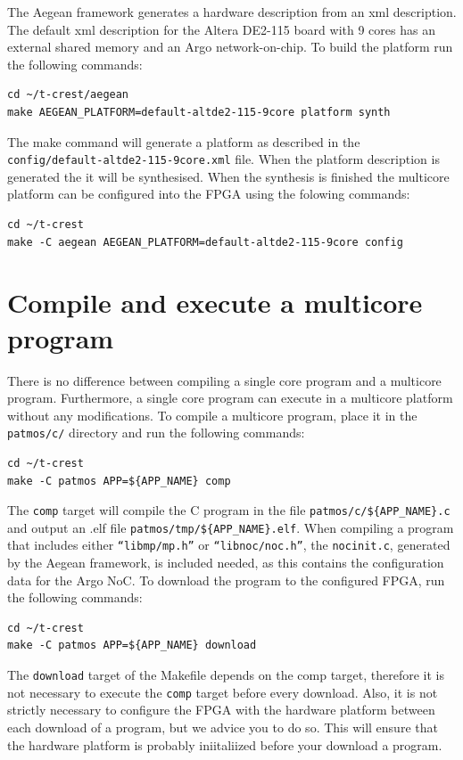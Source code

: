 \documentclass[a4paper,fontsize=10pt,twoside,DIV15,BCOR12mm,headinclude=true,footinclude=false,pagesize,bibtotoc]{scrbook}
\newcommand{\code}[1]{{\texttt{#1}}}
\begin{document}
The Aegean framework generates a hardware description from an
xml description.
The default xml description for the Altera DE2-115 board with 9 cores
has an external shared memory and an Argo network-on-chip.
To build the platform run the following commands:
\begin{Verbatim}
cd ~/t-crest/aegean
make AEGEAN_PLATFORM=default-altde2-115-9core platform synth
\end{Verbatim}
The make command will generate a platform as described in the
\code{config/default-altde2-115-9core.xml} file.
When the platform description is generated the it will be synthesised.
When the synthesis is finished the multicore platform can be
configured into the FPGA using the folowing commands:
\begin{Verbatim}
cd ~/t-crest
make -C aegean AEGEAN_PLATFORM=default-altde2-115-9core config
\end{Verbatim}

\section{Compile and execute a multicore program}
\label{apx:buildsw}

There is no difference between compiling a single core program and a multicore program.
Furthermore, a single core program can execute in a multicore
platform without any modifications.
To compile a multicore program, place it in the \code{patmos/c/} directory
and run the following commands:

\begin{Verbatim}
cd ~/t-crest
make -C patmos APP=${APP_NAME} comp
\end{Verbatim}

The \code{comp} target will compile the C program in the file \code{patmos/c/\$\{APP\_NAME\}.c}
and output an .elf file \code{patmos/tmp/\$\{APP\_NAME\}.elf}.
When compiling a program that includes either \code{``libmp/mp.h''} or \code{``libnoc/noc.h''},
the \code{nocinit.c}, generated by the Aegean framework, is included needed,
as this contains the configuration data for the Argo NoC.
To download the program to the configured FPGA, run the following commands:

\begin{Verbatim}
cd ~/t-crest
make -C patmos APP=${APP_NAME} download
\end{Verbatim}

The \code{download} target of the Makefile depends on the comp target,
therefore it is not necessary to execute the \code{comp} target before every download.
Also, it is not strictly necessary to configure the FPGA with the hardware
platform between each download of a program, but we advice you to do so.
This will ensure that the hardware platform is probably iniitaliized
before your download a program.
\end{document}

